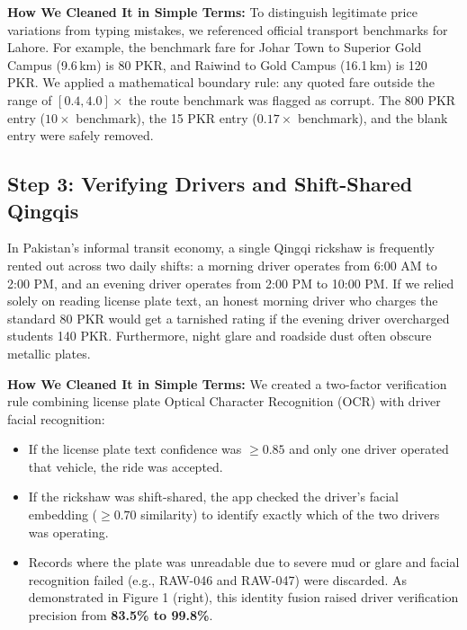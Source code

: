 \documentclass[10pt, a4paper]{article}
\begin{document}
\textbf{How We Cleaned It in Simple Terms:}
To distinguish legitimate price variations from typing mistakes, we referenced official transport benchmarks for Lahore. For example, the benchmark fare for Johar Town to Superior Gold Campus (9.6\,km) is 80 PKR, and Raiwind to Gold Campus (16.1\,km) is 120 PKR. We applied a mathematical boundary rule: any quoted fare outside the range of \(\mathbf{[0.4, 4.0]\times}\) the route benchmark was flagged as corrupt. The 800 PKR entry (\(10\times\) benchmark), the 15 PKR entry (\(0.17\times\) benchmark), and the blank entry were safely removed.

\subsection{Step 3: Verifying Drivers and Shift-Shared Qingqis}
\begin{stepbox}
In Pakistan's informal transit economy, a single Qingqi rickshaw is frequently rented out across two daily shifts: a morning driver operates from 6:00 AM to 2:00 PM, and an evening driver operates from 2:00 PM to 10:00 PM. If we relied solely on reading license plate text, an honest morning driver who charges the standard 80 PKR would get a tarnished rating if the evening driver overcharged students 140 PKR. Furthermore, night glare and roadside dust often obscure metallic plates.
\end{stepbox}

\textbf{How We Cleaned It in Simple Terms:}
We created a two-factor verification rule combining license plate Optical Character Recognition (OCR) with driver facial recognition:
\begin{itemize}\setlength{\itemsep}{0.8pt}\setlength{\parskip}{0pt}
  \item If the license plate text confidence was \(\ge 0.85\) and only one driver operated that vehicle, the ride was accepted.
  \item If the rickshaw was shift-shared, the app checked the driver's facial embedding (\(\ge 0.70\) similarity) to identify exactly which of the two drivers was operating.
  \item Records where the plate was unreadable due to severe mud or glare and facial recognition failed (e.g., RAW-046 and RAW-047) were discarded. As demonstrated in Figure 1 (right), this identity fusion raised driver verification precision from \textbf{83.5\% to 99.8\%}.
\end{itemize}
\end{document}
